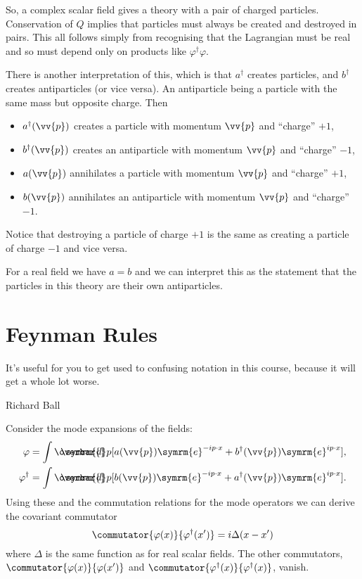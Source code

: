 \documentclass[fleqn]{NotesClass}
\newcommand{\e}{\symrm{e}}
\newcommand{\hermit}{{\dagger}}
\newcommand{\dbar}[1][0.0]{\ThisStyle{\ensurestackMath{%
            \stackengine{#1\LMex}{\SavedStyle \symrm{d}}{\SavedStyle\overbar{}%
                \mkern2.25mu}{O}{r}{F}{F}{L}}}}
\newcommand{\invariantmeasure}[1]{%
    \mathchoice{\dbar #1}{\dbar #1}{\dbar[.05] #1}{\dbar[.06] #1}
}
\begin{document}
    So, a complex scalar field gives a theory with a pair of charged particles.
    Conservation of \(Q\) implies that particles must always be created and destroyed in pairs.
    This all follows simply from recognising that the Lagrangian must be real and so must depend only on products like \(\varphi^\hermit \varphi\).
    
    There is another interpretation of this, which is that \(a^\hermit\) creates particles, and \(b^\hermit\) creates antiparticles (or vice versa).
    An antiparticle being a particle with the same mass but opposite charge.
    Then
    \begin{itemize}
        \item \(a^\hermit(\vv{p})\) creates a particle with momentum \(\vv{p}\) and \enquote{charge} \(+1\),
        \item \(b^\hermit(\vv{p})\) creates an antiparticle with momentum \(\vv{p}\) and \enquote{charge} \(-1\),
        \item \(a(\vv{p})\) annihilates a particle with momentum \(\vv{p}\) and \enquote{charge} \(+1\),
        \item \(b(\vv{p})\) annihilates an antiparticle with momentum \(\vv{p}\) and \enquote{charge} \(-1\).
    \end{itemize}
    Notice that destroying a particle of charge \(+1\) is the same as creating a particle of charge \(-1\) and vice versa.
    
    For a real field we have \(a = b\) and we can interpret this as the statement that the particles in this theory are their own antiparticles.
    
    \section{Feynman Rules}
    \epigraph{It's useful for you to get used to confusing notation in this course, because it will get a whole lot worse.}{Richard Ball}
    Consider the mode expansions of the fields:
    \begin{align}
        \varphi &= \int \invariantmeasure{p} [a(\vv{p})\e^{-ip\cdot x} + b^\hermit(\vv{p})\e^{ip\cdot x}],\\
        \varphi^\hermit &= \int \invariantmeasure{p} [b(\vv{p})\e^{-ip\cdot x} + a^\hermit(\vv{p})\e^{ip\cdot x}].
    \end{align}
    Using these and the commutation relations for the mode operators we can derive the covariant commutator
    \begin{equation}
        \commutator{\varphi(x)}{\varphi^\hermit(x')} = i\Delta(x - x')
    \end{equation}
    where \(\Delta\) is the same function as for real scalar fields.
    The other commutators, \(\commutator{\varphi(x)}{\varphi(x')}\) and \(\commutator{\varphi^\hermit(x)}{\varphi^\hermit(x)}\), vanish.
    
\end{document}
